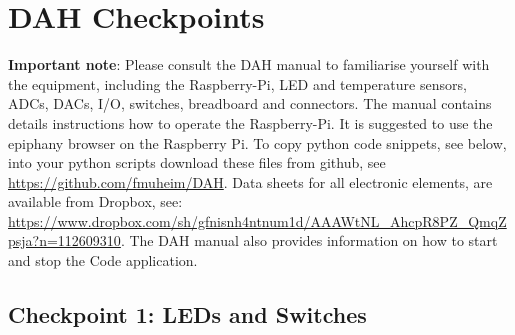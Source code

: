 \chapter{DAH Checkpoints}
\label{sec:checkpoints}
\vspace*{-0.99cm}
{\bf Important note}: Please consult the DAH manual to familiarise yourself with the equipment, including the Raspberry-Pi, LED and temperature sensors, ADCs, DACs, I/O, switches, breadboard and connectors. The manual contains details instructions how to operate the Raspberry-Pi. It is suggested to use the epiphany browser on the Raspberry Pi. To copy python code snippets, see below, into your python scripts download these files from github, see \url{https://github.com/fmuheim/DAH}.  Data sheets for all electronic elements, are available from Dropbox,
see: \url{https://www.dropbox.com/sh/gfnisnh4ntnum1d/AAAWtNL_AhcpR8PZ_QmqZpsja?n=112609310}.  
The DAH manual also provides information on how to start and stop the \webIOPi Code application.

\section{Checkpoint  1: LEDs and Switches}

